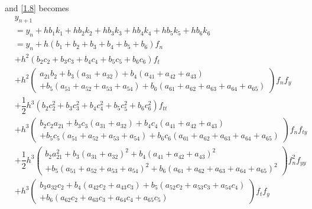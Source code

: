 \documentclass[a4paper,oneside]{book}
\numberwithin{equation}{chapter}
\begin{document}
and \eqref{1.8} becomes
\begin{align}
&{{y_{n + 1}}} \\
&= {{y_n}} + h{b_1}{k_1} + h{b_2}{k_2} + h{b_3}{k_3} + h{b_4}{k_4} + h{b_5}{k_5} + h{b_6}{k_6}\\
&= {{y_n}} + h\left( {{b_1} + {b_2} + {b_3} + {b_4} + {b_5} + {b_6}} \right){f_n}\\
& + {h^2}\left( {{b_2}{c_2} + {b_3}{c_3} + {b_4}{c_4} + {b_5}{c_5} + {b_6}{c_6}} \right){f_t}\\
& + {h^2}\left( \begin{array}{l}
{a_{21}}{b_2} + {b_3}\left( {{a_{31}} + {a_{32}}} \right) + {b_4}\left( {{a_{41}} + {a_{42}} + {a_{43}}} \right)\\
 + {b_5}\left( {{a_{51}} + {a_{52}} + {a_{53}} + {a_{54}}} \right) + {b_6}\left( {{a_{61}} + {a_{62}} + {a_{63}} + {a_{64}} + {a_{65}}} \right)
\end{array} \right){f_n}{f_y}\\
& + \dfrac{1}{2}{h^3}\left( {{b_2}c_2^2 + {b_3}c_3^2 + {b_4}c_4^2 + {b_5}c_5^2 + {b_6}c_6^2} \right){f_{tt}}\\
& + {h^3}\left( \begin{array}{l}
{b_2}{c_2}{a_{21}} + {b_3}{c_3}\left( {{a_{31}} + {a_{32}}} \right) + {b_4}{c_4}\left( {{a_{41}} + {a_{42}} + {a_{43}}} \right)\\
 + {b_5}{c_5}\left( {{a_{51}} + {a_{52}} + {a_{53}} + {a_{54}}} \right) + {b_6}{c_6}\left( {{a_{61}} + {a_{62}} + {a_{63}} + {a_{64}} + {a_{65}}} \right)
\end{array} \right){f_n}{f_{ty}}\\
& + \dfrac{1}{2}{h^3}\left( \begin{array}{l}
{b_2}a_{21}^2 + {b_3}{\left( {{a_{31}} + {a_{32}}} \right)^2} + {b_4}{\left( {{a_{41}} + {a_{42}} + {a_{43}}} \right)^2}\\
 + {b_5}{\left( {{a_{51}} + {a_{52}} + {a_{53}} + {a_{54}}} \right)^2} + {b_6}{\left( {{a_{61}} + {a_{62}} + {a_{63}} + {a_{64}} + {a_{65}}} \right)^2}
\end{array} \right)f_n^2{f_{yy}}\\
& + {h^3}\left( \begin{array}{l}
{b_3}{a_{32}}{c_2} + {b_4}\left( {{a_{42}}{c_2} + {a_{43}}{c_3}} \right) + {b_5}\left( {{a_{52}}{c_2} + {a_{53}}{c_3} + {a_{54}}{c_4}} \right)\\
 + {b_6}\left( {{a_{62}}{c_2} + {a_{63}}{c_3} + {a_{64}}{c_4} + {a_{65}}{c_5}} \right)
\end{array} \right){f_t}{f_y}\\

\end{align}
\end{document}
